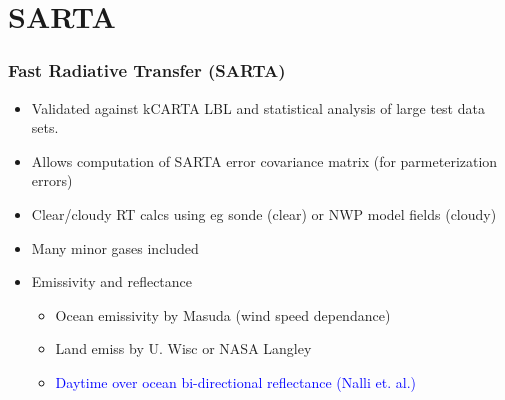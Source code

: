 \documentclass[10pt,t]{beamer}
\begin{document}
\begin{frame}
\begin{columns}
  \end{columns}
  
\end{frame}
\section{SARTA}
\begin{frame}\frametitle{Fast Radiative Transfer (SARTA)}
  \begin{itemize}
  \item Validated against kCARTA LBL and statistical analysis of large test
    data sets.
  \item Allows computation of SARTA error covariance matrix (for
    parmeterization errors)
  \item Clear/cloudy RT calcs using eg sonde (clear) or NWP model fields
    (cloudy)
  \item Many minor gases included
  \item Emissivity and reflectance
    \begin{itemize}
    \item Ocean emissivity by Masuda (wind speed dependance)
    \item Land emiss by U. Wisc or NASA Langley
    \item \textcolor{blue}{Daytime over ocean bi-directional reflectance
        (Nalli et. al.)}
    \end{itemize}
  \end{itemize}
\end{frame}
\end{document}
